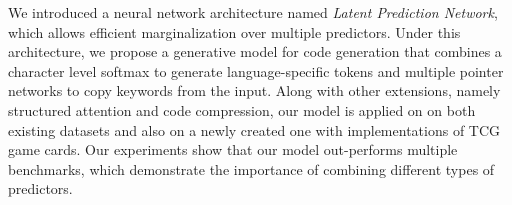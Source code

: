 \documentclass[11pt]{article}
\begin{document}
We introduced a neural network architecture named \emph{Latent Prediction Network}, which allows efficient marginalization over multiple
predictors. Under this architecture, we propose a generative model for code generation that combines a character level softmax to generate language-specific tokens and multiple pointer networks to copy keywords from the input. Along with other extensions, namely structured attention and code compression, our model is applied on on both existing datasets and also on a newly created one with implementations of TCG game cards. Our experiments show that our model out-performs multiple benchmarks, which demonstrate the importance of combining different types of predictors.








\appendix
\end{document}
